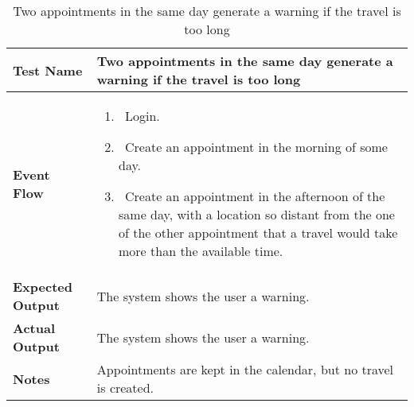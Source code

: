 \begin{table}[h]	
\centering
\def\arraystretch{1.5}
\begin{tabular}{|m{7cm}|m{7cm}|}
	\hline
	\textbf{Test Name}            &  Two appointments in the same day generate a warning if the travel is too long  \\ \hline
	\textbf{Event Flow}             &   
		\begin{enumerate}
			\item~Login.
			\item~Create an appointment in the morning of some day.
			\item~Create an appointment in the afternoon of the same day, with a location so distant from the one of the other appointment that a travel would take more than the available time.
		\end{enumerate}
	\\ \hline
	\textbf{Expected Output}  &  The system shows the user a warning.   \\ \hline
	\textbf{Actual Output}       &   The system shows the user a warning.  \\ \hline
	\textbf{Notes} &  Appointments are kept in the calendar, but no travel is created.   \\ \hline
\end{tabular}
\caption{Two appointments in the same day generate a warning if the travel is too long}
\end{table}


